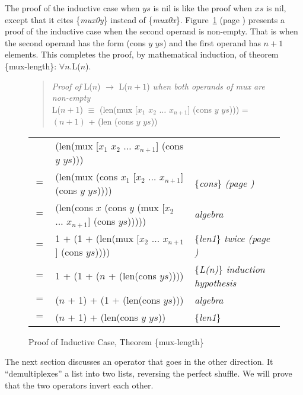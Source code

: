 The proof of the inductive case when $ys$ is nil
is like the proof when $xs$ is nil,
except that it cites \{\emph{mux0y}\} instead of \{\emph{mux0x}\}.
Figure~\ref{fig:prf-mux-len-induc} (page \pageref{fig:prf-mux-len-induc})
presents a proof  of the inductive case when the second operand is non-empty.
That is when the second operand has the form (cons $y$ $ys$)
and the first operand has $n+1$ elements.
This completes the proof, by mathematical induction, of
theorem \{mux-length\}: $\forall n.$L($n$).

\begin{figure}
\begin{quote}
\emph{Proof of} L($n$) $\rightarrow$ L($n+1$) \emph{when both operands of mux are non-empty}\\
L($n+1$) $\equiv$ (len(mux [$x_1$ $x_2$ $\dots$ $x_{n+1}$] (cons $y$ $ys$))) = $(n+1)$ + (len (cons $y$ $ys$))
\end{quote}
\begin{center}
\begin{tabular}{lll}
    & (len(mux [$x_1$ $x_2$ $\dots$ $x_{n+1}$] (cons $y$ $ys$)))             &   \\
$=$ & (len(mux (cons $x_1$ [$x_2$ $\dots$ $x_{n+1}$] (cons $y$ $ys$))))      & \{\emph{cons}\} \emph{(page \pageref{first-rest-cons})} \\
$=$ & (len(cons $x$ (cons $y$ (mux [$x_2$ $\dots$ $x_{n+1}$] (cons $ys$))))) & \emph{algebra} \\
$=$ & 1 + (1 + (len(mux [$x_2$ $\dots$ $x_{n+1}$] (cons $ys$))))             & \{\emph{len1}\} \emph{twice (page \pageref{len-equations})} \\
$=$ & 1 + (1 + ($n$ + (len(cons $ys$))))                                     & \{\emph{L(n)}\} \emph{induction hypothesis} \\
$=$ & ($n$ + 1) + (1 + (len(cons $ys$)))                                     & \emph{algebra} \\
$=$ & ($n$ + 1) + (len(cons $y$ $ys$))                                       & \{\emph{len1}\} \\
\end{tabular}
\end{center}
\caption{Proof of Inductive Case, Theorem \{mux-length\}}
\label{fig:prf-mux-len-induc}
\end{figure}

The next section discusses an operator that goes in the other direction.
It ``demultiplexes'' a list into two lists, reversing the perfect shuffle.
We will prove that the two operators invert each other.

